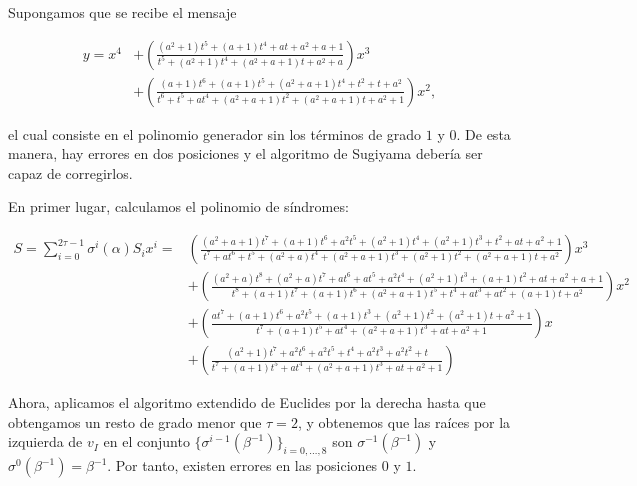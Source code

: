 \begin{ejemplo}
Supongamos que se recibe el mensaje 

\begin{equation}
    \begin{aligned}
    y = x^4 &+ \left( \frac{(a^2 + 1)t^5 + (a + 1)t^4 + a t + a^2 + a + 1}{t^5 + (a^2 + 1)t^4 + (a^2 + a + 1)t + a^2 + a} \right) x^3 \\
    &+ \left( \frac{(a + 1)t^6 + (a + 1)t^5 + (a^2 + a + 1)t^4 + t^2 + t + a^2}{t^6 + t^5 + a t^4 + (a^2 + a + 1)t^2 + (a^2 + a + 1)t + a^2 + 1} \right) x^2,
\end{aligned}
\end{equation}

el cual consiste en el polinomio generador sin los términos de grado $1$ y $0$. De esta manera, hay errores en dos posiciones y el algoritmo de Sugiyama debería ser capaz de corregirlos.

En primer lugar, calculamos el polinomio de síndromes:

\begin{equation}
    \begin{aligned}
    S = \sum_{i=0}^{2\tau - 1} \sigma^i(\alpha) S_i x^i = 
    & \left( \frac{(a^2 + a + 1)t^7 + (a + 1)t^6 + a^2 t^5 + (a^2 + 1)t^4 + (a^2 + 1)t^3 + t^2 + a t + a^2 + 1}{t^7 + a t^6 + t^5 + (a^2 + a)t^4 + (a^2 + a + 1)t^3 + (a^2 + 1)t^2 + (a^2 + a + 1)t + a^2} \right) x^3 \\
    &+ \left( \frac{(a^2 + a)t^8 + (a^2 + a)t^7 + a t^6 + a t^5 + a^2 t^4 + (a^2 + 1)t^3 + (a + 1)t^2 + a t + a^2 + a + 1}{t^8 + (a + 1)t^7 + (a + 1)t^6 + (a^2 + a + 1)t^5 + t^4 + a t^3 + a t^2 + (a + 1)t + a^2} \right) x^2 \\
    &+ \left( \frac{a t^7 + (a + 1)t^6 + a^2 t^5 + (a + 1)t^3 + (a^2 + 1)t^2 + (a^2 + 1)t + a^2 + 1}{t^7 + (a + 1)t^5 + a t^4 + (a^2 + a + 1)t^3 + a t + a^2 + 1} \right) x \\
    &+ \left( \frac{(a^2 + 1)t^7 + a^2 t^6 + a^2 t^5 + t^4 + a^2 t^3 + a^2 t^2 + t}{t^7 + (a + 1)t^5 + a t^4 + (a^2 + a + 1)t^3 + a t + a^2 + 1} \right)
    \end{aligned}
    \end{equation}

Ahora, aplicamos el algoritmo extendido de Euclides por la derecha hasta que obtengamos un resto de grado menor que $\tau = 2$, y obtenemos que las raíces por la izquierda de $v_I$ en el conjunto $\{\sigma^{i-1}(\beta^{-1})\}_{i=0,\dots,8}$ son $\sigma^{-1}(\beta^{-1})$ y $\sigma^0(\beta^{-1}) = \beta^{-1}$. Por tanto, existen errores en las posiciones $0$ y $1$.


\end{ejemplo}
